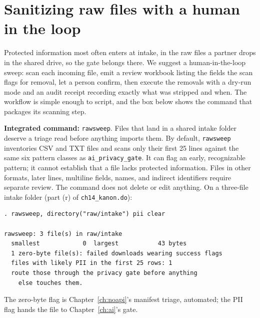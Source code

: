 \documentclass[
    a4paper,
    fontsize=10pt,
    twoside=true,
    numbers=noenddot,
]{kaobook}
\begin{document}
\section{Sanitizing raw files with a human in the loop}\label{sec:rawsweep}
Protected information most often enters at intake, in the raw files a partner drops in the shared drive, so the gate belongs there. We suggest a human-in-the-loop sweep: scan each incoming file, emit a review workbook listing the fields the scan flags for removal, let a person confirm, then execute the removals with a dry-run mode and an audit receipt recording exactly what was stripped and when. The workflow is simple enough to script, and the box below shows the command that packages its scanning step.

\begin{kaobox}[frametitle=Package Integration: \texttt{rawsweep}]
\textbf{Integrated command:} \texttt{rawsweep}. Files that land in a shared intake folder deserve a triage read before anything imports them. By default, \texttt{rawsweep} inventories CSV and TXT files and scans only their first 25 lines against the same six pattern classes as \texttt{ai\_privacy\_gate}. It can flag an early, recognizable pattern; it cannot establish that a file lacks protected information. Files in other formats, later lines, multiline fields, names, and indirect identifiers require separate review. The command does not delete or edit anything. On a three-file intake folder (part (r) of \texttt{ch14\_kanon.do}):
\par
{\footnotesize
\begin{verbatim}
. rawsweep, directory("raw/intake") pii clear

rawsweep: 3 file(s) in raw/intake
  smallest            0  largest           43 bytes
  1 zero-byte file(s): failed downloads wearing success flags
  files with likely PII in the first 25 rows: 1
  route those through the privacy gate before anything
    else touches them.
\end{verbatim}
}
The zero-byte flag is Chapter~\ref{ch:noapi}'s manifest triage, automated; the PII flag hands the file to Chapter~\ref{ch:ai}'s gate.
\end{kaobox}
\end{document}
